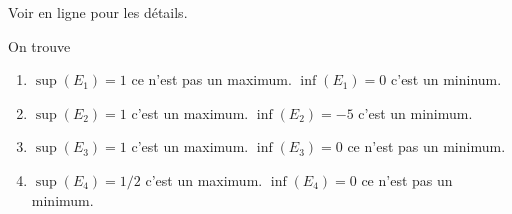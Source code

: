 
\begin{correction}
Voir en ligne pour les détails. 

On trouve 
\begin{enumerate}
	\item $\sup(E_1) =1$ ce n'est pas un maximum. $\inf(E_1)= 0$ c'est un mininum.
	\item $\sup(E_2)= 1$ c'est un maximum. $\inf(E_2)=-5$ c'est un minimum.
	\item $\sup(E_3) =1$ c'est un maximum. $\inf(E_3) = 0$ ce n'est pas un minimum. 
	\item $\sup(E_4)=1/2$ c'est un maximum. $\inf(E_4)=0$ ce n'est pas un minimum. 
\end{enumerate}
\end{correction}